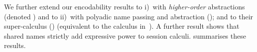 We further extend our encodability results to 
i)~\HOp with \emph{higher-order} abstractions (denoted \HOpp) 
and to ii)~\HOp with polyadic name passing and abstraction (\pHOp); and to
their super-calculus  (\PHOpp) (equivalent to the calculus in~\cite{tlca07}). 
A further result shows that 
shared names
strictly add expressive power 
to session calculi. 
 summarises %
these results. %

